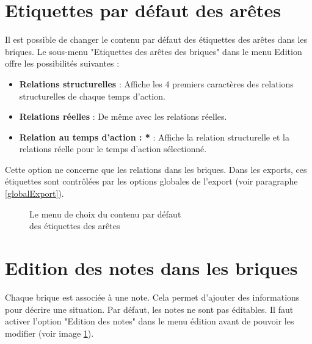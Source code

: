 \section{Etiquettes par défaut des arêtes}
Il est possible de changer le contenu par défaut des étiquettes des arêtes dans les briques. Le sous-menu "Etiquettes des arêtes des briques" dans le menu Edition offre les possibilités suivantes :\\
\begin{itemize}
\item \textbf{Relations structurelles} : Affiche les 4 premiers caractères des relations structurelles de chaque temps d'action.\\
\item \textbf{Relations réelles} : De même avec les relations réelles.\\
\item \textbf{Relation au temps d'action : *} : Affiche la relation structurelle et la relations réelle pour le temps d'action sélectionné.\\ 
\end{itemize}

Cette option ne concerne que les relations dans les briques. Dans les exports, ces étiquettes sont contrôlées par les options globales de l'export (voir paragraphe \ref{globalExport}).\\

\begin{figure}[h!]
\centering
{}
\caption{Le menu de choix du contenu par défaut\\des étiquettes des arêtes}
\label{menu_edition}
\end{figure}


\section{Edition des notes dans les briques}
Chaque brique est associée à une note. Cela permet d'ajouter des informations pour décrire une situation. Par défaut, les notes ne sont pas éditables. Il faut activer l'option "Edition des notes" dans le menu édition avant de pouvoir les modifier (voir image \ref{menu_edition}).\\

